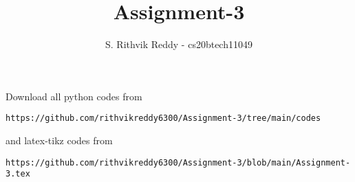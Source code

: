 \documentclass[journal,12pt,twocolumn]{IEEEtran}
\DeclareMathOperator*{\Res}{Res}
\begin{document}
\newcommand{\BEQA}{\begin{eqnarray}}
\newcommand{\EEQA}{\end{eqnarray}}
\newcommand{\define}{\stackrel{\triangle}{=}}

\raggedbottom
\setlength{\parindent}{0pt}
\providecommand{\mbf}{\mathbf}
\providecommand{\pr}[1]{\ensuremath{\Pr\left(#1\right)}}
\providecommand{\qfunc}[1]{\ensuremath{Q\left(#1\right)}}
\providecommand{\sbrak}[1]{\ensuremath{{}\left[#1\right]}}
\providecommand{\lsbrak}[1]{\ensuremath{{}\left[#1\right.}}
\providecommand{\rsbrak}[1]{\ensuremath{{}\left.#1\right]}}
\providecommand{\brak}[1]{\ensuremath{\left(#1\right)}}
\providecommand{\lbrak}[1]{\ensuremath{\left(#1\right.}}
\providecommand{\rbrak}[1]{\ensuremath{\left.#1\right)}}
\providecommand{\cbrak}[1]{\ensuremath{\left\{#1\right\}}}
\providecommand{\lcbrak}[1]{\ensuremath{\left\{#1\right.}}
\providecommand{\rcbrak}[1]{\ensuremath{\left.#1\right\}}}
\theoremstyle{remark}
\newtheorem{rem}{Remark}
\newcommand{\sgn}{\mathop{\mathrm{sgn}}}
\providecommand{\abs}[1]{\vert#1\vert}
\providecommand{\res}[1]{\Res\displaylimits_{#1}} 
\providecommand{\norm}[1]{\lVert#1\rVert}
\providecommand{\mtx}[1]{\mathbf{#1}}
\providecommand{\mean}[1]{E[ #1 ]}
\providecommand{\fourier}{\overset{\mathcal{F}}{ \rightleftharpoons}}
\providecommand{\system}{\overset{\mathcal{H}}{ \longleftrightarrow}}
\newcommand{\solution}{\noindent \textbf{Solution: }}
\newcommand{\cosec}{\,\text{cosec}\,}
\providecommand{\dec}[2]{\ensuremath{\overset{#1}{\underset{#2}{\gtrless}}}}
\newcommand{\myvec}[1]{\ensuremath{\begin{pmatrix}#1\end{pmatrix}}}
\newcommand{\mydet}[1]{\ensuremath{\begin{vmatrix}#1\end{vmatrix}}}
\makeatletter
{}
\makeatother
\let\StandardTheFigure\thefigure
\let\vec\mathbf
\renewcommand{\thefigure}{\theproblem}
\def\putbox#1#2#3{\makebox[0in][l]{\makebox[#1][l]{}\raisebox{\baselineskip}[0in][0in]{\raisebox{#2}[0in][0in]{#3}}}}
     \def\rightbox#1{\makebox[0in][r]{#1}}
     \def\centbox#1{\makebox[0in]{#1}}
     \def\topbox#1{\raisebox{-\baselineskip}[0in][0in]{#1}}
     \def\midbox#1{\raisebox{-0.5\baselineskip}[0in][0in]{#1}}
\vspace{3cm}
\title{Assignment-3}
\author{S. Rithvik Reddy - cs20btech11049}
\maketitle
\newpage
\bigskip
\renewcommand{\thefigure}{\theenumi}
\renewcommand{\thetable}{\theenumi}
Download all python codes from 
\begin{lstlisting}
https://github.com/rithvikreddy6300/Assignment-3/tree/main/codes
\end{lstlisting}
%
and latex-tikz codes from 
%
\begin{lstlisting}
https://github.com/rithvikreddy6300/Assignment-3/blob/main/Assignment-3.tex
\end{lstlisting}
\end{document}
